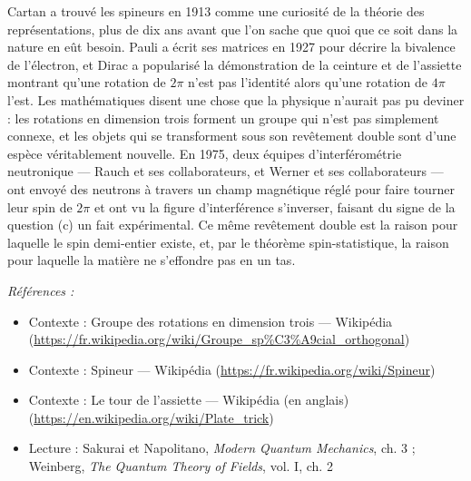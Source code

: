 \documentclass[11pt]{article}
\newenvironment{refs}{\par\small\noindent\emph{Références :}\begin{itemize}\setlength\itemsep{0pt}}{\end{itemize}\normalsize}
\begin{document}
\noindent Cartan a trouvé les spineurs en 1913 comme une curiosité de la théorie des
représentations, plus de dix ans avant que l'on sache que quoi que ce soit dans la nature en eût
besoin. Pauli a écrit ses matrices en 1927 pour décrire la bivalence de l'électron, et Dirac a
popularisé la démonstration de la ceinture et de l'assiette montrant qu'une rotation de $2\pi$
n'est pas l'identité alors qu'une rotation de $4\pi$ l'est. Les mathématiques disent une chose
que la physique n'aurait pas pu deviner : les rotations en dimension trois forment un groupe qui
n'est pas simplement connexe, et les objets qui se transforment sous son revêtement double sont
d'une espèce véritablement nouvelle. En 1975, deux équipes d'interférométrie neutronique --- Rauch
et ses collaborateurs, et Werner et ses collaborateurs --- ont envoyé des neutrons à travers un
champ magnétique réglé pour faire tourner leur spin de $2\pi$ et ont vu la figure
d'interférence s'inverser, faisant du signe de la question (c) un fait expérimental. Ce même
revêtement double est la raison pour laquelle le spin demi-entier existe, et, par le théorème
spin-statistique, la raison pour laquelle la matière ne s'effondre pas en un tas.

\begin{refs}
\item Contexte : Groupe des rotations en dimension trois --- Wikipédia (\url{https://fr.wikipedia.org/wiki/Groupe_sp%C3%A9cial_orthogonal})
\item Contexte : Spineur --- Wikipédia (\url{https://fr.wikipedia.org/wiki/Spineur})
\item Contexte : Le tour de l'assiette --- Wikipédia (en anglais) (\url{https://en.wikipedia.org/wiki/Plate_trick})
\item Lecture : Sakurai et Napolitano, \textit{Modern Quantum Mechanics}, ch. 3 ; Weinberg, \textit{The Quantum Theory of Fields}, vol. I, ch. 2
\end{refs}

\bigskip
\end{document}
